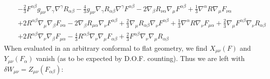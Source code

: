 \documentclass[10pt,letterpaper]{article}
\numberwithin{equation}{section}
\begin{document}
\begin{eqnarray}
&& -  \tfrac{2}{3} F^{\alpha \beta } g_{\mu \nu } \nabla_{\gamma }\nabla^{\gamma }R_{\alpha \beta } -  \tfrac{4}{3} g_{\mu \nu } \nabla_{\gamma }R_{\alpha \beta } \nabla^{\gamma }F^{\alpha \beta } - 2 \nabla_{\beta }R_{\nu \alpha } \nabla_{\mu }F^{\alpha \beta } + \tfrac{1}{3} \nabla^{\alpha }R \nabla_{\mu }F_{\nu \alpha } \nonumber \\ 
&& + 2 R^{\alpha \beta } \nabla_{\mu }\nabla_{\beta }F_{\nu \alpha } - 2 \nabla_{\beta }R_{\mu \alpha } \nabla_{\nu }F^{\alpha \beta } + \tfrac{2}{3} \nabla_{\mu }R_{\alpha \beta } \nabla_{\nu }F^{\alpha \beta } + \tfrac{1}{3} \nabla^{\alpha }R \nabla_{\nu }F_{\mu \alpha } + \tfrac{2}{3} \nabla_{\mu }F^{\alpha \beta } \nabla_{\nu }R_{\alpha \beta } \nonumber \\ 
&& + 2 R^{\alpha \beta } \nabla_{\nu }\nabla_{\beta }F_{\mu \alpha } -  \tfrac{4}{3} R^{\alpha \beta } \nabla_{\nu }\nabla_{\mu }F_{\alpha \beta } + \tfrac{2}{3} F^{\alpha \beta } \nabla_{\nu }\nabla_{\mu }R_{\alpha \beta }
\end{eqnarray}
When evaluated in an arbitrary conformal to flat geometry, we find $X_{\mu\nu}(F)$ and $Y_{\mu\nu}(F_\alpha)$ vanish (as to be expected by D.O.F. counting). Thus we are left with $\delta W_{\mu\nu}= Z_{\mu\nu}(F_{\alpha\beta})$:
\end{document}
